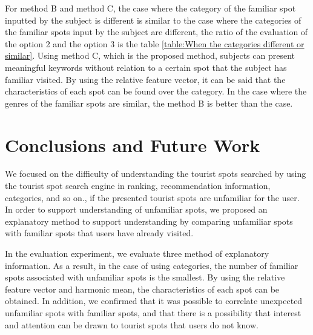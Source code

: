 \documentclass[journal]{IAENGtran}
\begin{document}
For method B and method C, the case where the category of the familiar spot inputted by the subject is different is similar to the case where the categories of the familiar spots input by the subject are different, the ratio of the evaluation of the option 2 and the option 3 is the table \ref{table:When the categories different or similar}.
Using method C, which is the proposed method, subjects can present meaningful keywords without relation to a certain spot that the subject has familiar visited.
By using the relative feature vector, it can be said that the characteristics of each spot can be found over the category.
In the case where the genres of the familiar spots are similar, the method B is better than the case.

\section{Conclusions and Future Work}
\label{sec:Conclusions and Future Work}
We focused on the difficulty of understanding the tourist spots searched by using the tourist spot search engine in ranking, recommendation information, categories, and so on., if the presented tourist spots are unfamiliar for the user.
In order to support understanding of unfamiliar spots, we proposed an explanatory method to support understanding by comparing unfamiliar spots with familiar spots that users have already visited.

In the evaluation experiment, we evaluate three method of explanatory information.
As a result, in the case of using categories, the number of familiar spots associated with unfamiliar spots is the smallest.
By using the relative feature vector and harmonic mean, the characteristics of each spot can be obtained.
In addition, we confirmed that it was possible to correlate unexpected unfamiliar spots with familiar spots, and that there is a possibility that interest and attention can be drawn to tourist spots that users do not know.
\end{document}
